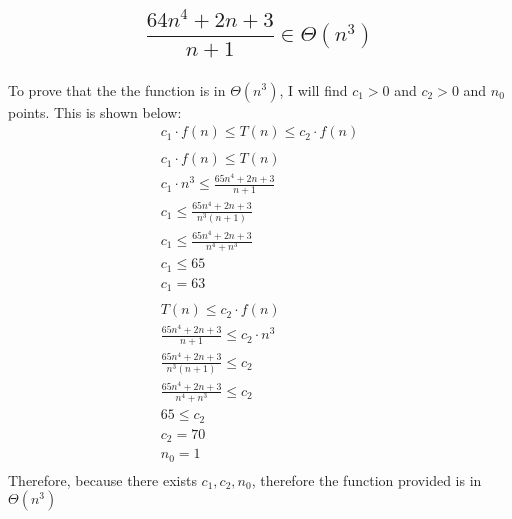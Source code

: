 \documentclass{article}
\begin{document}
    
    \subsection{$$\frac{64n^4 + 2n + 3}{n + 1} \in \Theta (n^3)$$}
        \subsubsection{}
            To prove that the the function is in $\Theta (n^3)$, I will find $c_1 > 0$ and $c_2 > 0$ and $n_0$ points. This is shown below:
            \begin{align*}
                c_1 \cdot f(n) \leq T(n) \leq c_2 \cdot f(n)\\
                \\
                c_1 \cdot f(n) \leq T(n)\\
                c_1 \cdot n^3 \leq \frac{65n^4 + 2n + 3}{n + 1}\\
                c_1 \leq \frac{65n^4 + 2n + 3}{n^3 (n + 1)}\\
                c_1 \leq \frac{65n^4 + 2n + 3}{n^4 + n^3}\\
                c_1 \leq 65\\
                c_1 = 63\\
                \\
                T(n) \leq c_2 \cdot f(n)\\
                \frac{65n^4 + 2n + 3}{n + 1} \leq c_2 \cdot n^3\\
                \frac{65n^4 + 2n + 3}{n^3 (n + 1)} \leq c_2\\
                \frac{65n^4 + 2n + 3}{n^4 + n^3} \leq c_2\\
                65 \leq c_2\\
                c_2 = 70\\
                n_0 = 1\\
            \end{align*}
            Therefore, because there exists $c_1, c_2, n_0$, therefore the function provided is in $\Theta (n^3)$
\end{document}
